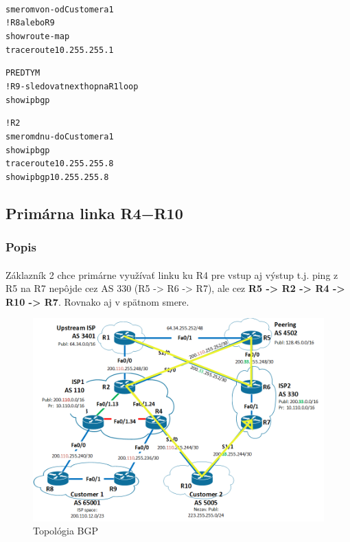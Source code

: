 \documentclass[12pt,twoside,a4paper]{report}
\begin{document}
\paragraph{}

\noindent
{\selectfont
\begin{small}
\begin{alltt}
smerom von - od Customera 1
!R8 alebo R9
show route-map
traceroute 10.255.255.1

PREDTYM
!R9 - sledovat next hop na R1 loop
show ip bgp 


!R2
smerom dnu - do Customera 1
show ip bgp
traceroute 10.255.255.8
show ip bgp 10.255.255.8
\end{alltt}
\end{small}
}







\subsection{Primárna linka R4−R10}
\subsubsection{Popis}
\paragraph{}
Záklazník 2 chce primárne využívať linku ku R4 pre vstup aj výstup t.j. ping z R5 na R7 nepôjde cez AS 330 (R5 -\textgreater{} R6 -\textgreater{} R7), ale cez \textbf{R5 -\textgreater{} R2 -\textgreater{} R4 -\textgreater{} R10 -\textgreater{} R7}. Rovnako aj v spätnom smere.

\begin{figure}[!htbp]
\centering
\includegraphics[width=14cm,keepaspectratio]{bgp_isis_r4_r10_primary}
\caption{Topológia BGP}
\label{fig:bgp_isis_topo}
\end{figure}
\end{document}
